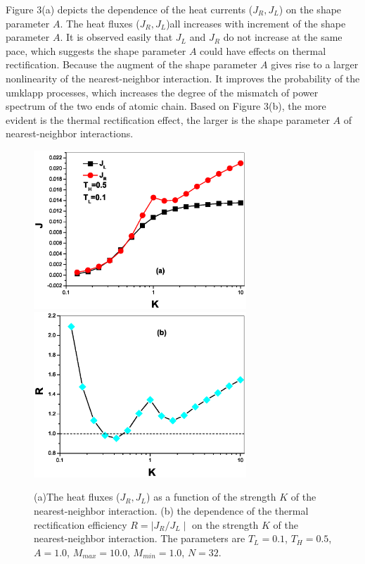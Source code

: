 \documentclass[pra,preprint,superscriptaddress,showkeys,showpacs]{revtex4}
\begin{document}
\indent Figure 3(a) depicts the dependence of the heat currents
($J_{R},J_{L}$) on the shape parameter $A$. The heat fluxes
($J_{R},J_{L}$)all increases with increment of the shape parameter
$A$. It is observed easily that $J_{L}$ and $J_{R}$ do not increase
at the same pace, which suggests the shape parameter $A$ could have
effects on thermal rectification. Because the augment of the shape
parameter $A$ gives rise to a larger nonlinearity of the
nearest-neighbor interaction. It improves the probability of the
umklapp processes, which increases the degree of the mismatch of
power spectrum of the two ends of atomic chain. Based on Figure
3(b), the more evident is the thermal rectification effect,
the larger is the shape parameter $A$ of nearest-neighbor interactions.\\

\begin{figure}
\centering
\includegraphics[width=8cm]{fig4a.eps}
\centering
\includegraphics[width=8cm]{fig4b.eps}
\caption{(a)The heat fluxes ($J_{R},J_{L}$) as a function of the
strength $K$ of the nearest-neighbor interaction. (b) the dependence
of the thermal rectification efficiency $R=\mid J_{R}/J_{L}\mid$ on
the strength $K$ of the nearest-neighbor interaction. The parameters
are $T_{L}=0.1$, $T_{H}=0.5$, $A=1.0$, $M_{max}=10.0$,
$M_{min}=1.0$, $N=32$.}
\end{figure}
\end{document}

